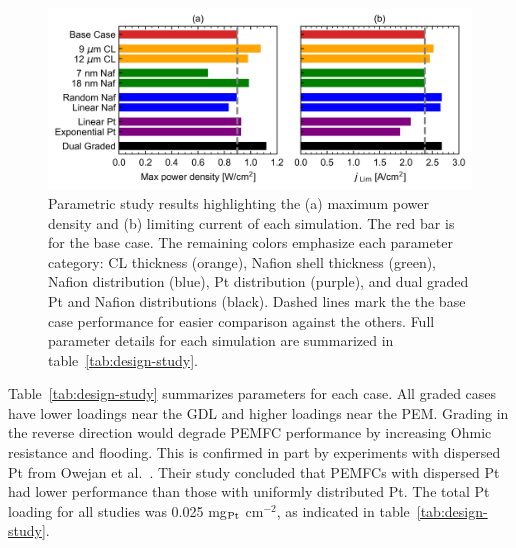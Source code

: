 \documentclass[final,3p,times,twocolumn]{elsarticle}    %
\begin{document}
\begin{figure}[!htb]
    \centering
    \includegraphics[width=6.238in]{figures/bar-charts-6_238in.png}
    \caption{Parametric study results highlighting the (a) maximum power density and (b) limiting current of each simulation. The red bar is for the base case. The remaining colors emphasize each parameter category: CL thickness (orange), Nafion shell thickness (green), Nafion distribution (blue), Pt distribution (purple), and dual graded Pt and Nafion distributions (black). Dashed lines mark the the base case performance for easier comparison against the others. Full parameter details for each simulation are summarized in table~\ref{tab:design-study}.}
    \label{fig:bar-charts}
\end{figure}


Table~\ref{tab:design-study} summarizes parameters for each case. All graded cases have lower loadings near the GDL and higher loadings near the PEM. Grading in the reverse direction would degrade PEMFC performance by increasing Ohmic resistance and flooding. This is confirmed in part by experiments with dispersed Pt from Owejan et al.~\cite{bib:owejan_2013}. Their study concluded that PEMFCs with dispersed Pt had lower performance than those with uniformly distributed Pt. The total Pt loading for all studies was 0.025 mg$_{\rm Pt}$ cm$^{-2}$, as indicated in table~\ref{tab:design-study}.  
\end{document}
